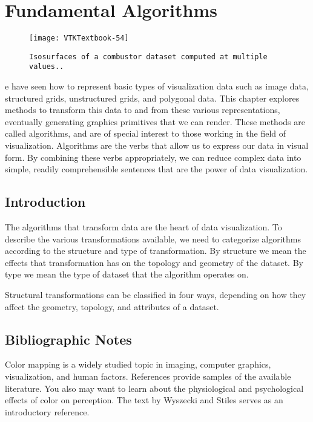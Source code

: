 \chapter{Fundamental Algorithms}
\label{chap:fundamental_algorithms}

\begin{figure}[ht]
	\hfill
	\begin{minipage}{0.5\textwidth}
		\centering
		\texttt{[image: VTKTextbook-54]}\\
		\caption*{\texttt{Isosurfaces of a combustor dataset computed at multiple values..}}
	\end{minipage}
\end{figure}

e have seen how to represent basic types of visualization data such as image data, structured grids, unstructured grids, and polygonal data.
This chapter explores methods to transform this data to and from these various representations, eventually generating graphics primitives that we can render.
These methods are called algorithms, and are of special interest to those working in the field of visualization.
Algorithms are the verbs that allow us to express our data in visual form.
By combining these verbs appropriately, we can reduce complex data into simple, readily comprehensible sentences that are the power of data visualization.

\section{Introduction}

The algorithms that transform data are the heart of data visualization.
To describe the various transformations available, we need to categorize algorithms according to the structure and type of transformation.
By structure we mean the effects that transformation has on the topology and geometry of the dataset.
By type we mean the type of dataset that the algorithm operates on.

Structural transformations can be classified in four ways, depending on how they affect the geometry, topology, and attributes of a dataset.

\section{Bibliographic Notes}

Color mapping is a widely studied topic in imaging, computer graphics, visualization, and human factors. References \cite{Durrett87} \cite{Ware88} \cite{Rheingans92} provide samples of the available literature. You also may want to learn about the physiological and psychological effects of color on perception. The text by Wyszecki and Stiles \cite{Wyszecki82} serves as an introductory reference.

